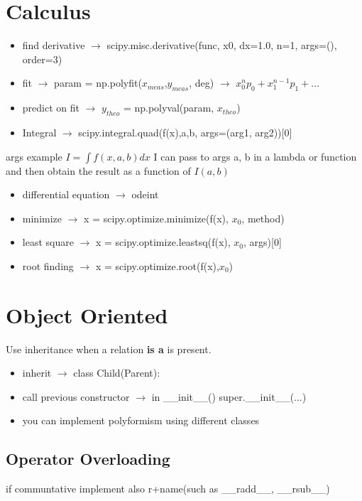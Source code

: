 \documentclass{article}
\begin{document}
\begin{multicols}{2}
\section{Calculus}
\begin{itemize}
\item find derivative $\rightarrow$ scipy.misc.derivative(func, x0, dx=1.0, n=1, args=(), order=3)
\item fit $\rightarrow$ param = np.polyfit($x_{meas}$,$y_{meas}$, deg)  $\rightarrow$  $x_0^n p_0+x_1^{n-1} p_1 + ...$
\item predict on fit $\rightarrow$ $y_{theo}$ = np.polyval(param, $x_{theo}$)
\item Integral  $\rightarrow$ scipy.integral.quad(f(x),a,b, args=(arg1, arg2))[0] 
\end{itemize}
args  example $I = \int f(x,a,b) dx $ I can pass to args a, b in a lambda or function and then  obtain the result as a function of $I(a,b)$ 
\begin{itemize}
\item differential equation $\rightarrow$ odeint
\item minimize $\rightarrow$ x = scipy.optimize.minimize(f(x), $x_0$, method)
\item least square $\rightarrow$ x = scipy.optimize.leastsq(f(x), $x_0$, args)[0]
\item root finding $\rightarrow$ x = scipy.optimize.root(f(x),$x_0$)
\end{itemize}
\section{Object Oriented}
Use inheritance when a relation  \textbf{is a} is present.
\begin{itemize}
\item inherit $\rightarrow$ class Child(Parent):
\item call previous constructor $\rightarrow$ in \_\_init\_\_() super.\_\_init\_\_(...)
\item you can implement polyformism using different classes
\end{itemize}
\subsection{Operator Overloading}
if communtative implement also r+name(such as \_\_radd\_\_, \_\_rsub\_\_)
\begin{itemize}


\end{itemize}
\end{multicols}
\end{document}
